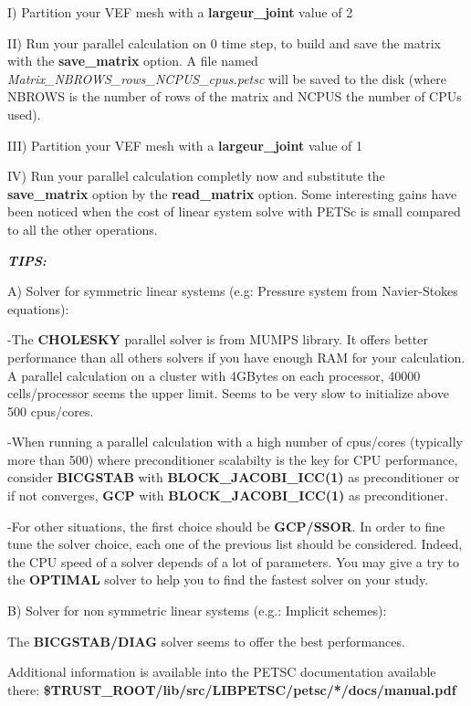 I) Partition your VEF mesh with a \textbf{largeur\_joint }value of 2

II) Run your parallel calculation on 0 time step, to build and save the matrix with the \textbf{save\_matrix} option. A
file named \textit{Matrix\_NBROWS\_rows\_NCPUS\_cpus.petsc} will be saved to the disk (where NBROWS is the number of
rows of the matrix and NCPUS the number of CPUs used). 

III) Partition your VEF mesh with a \textbf{largeur\_joint} value of 1

IV) Run your parallel calculation completly now and substitute the \textbf{save\_matrix} option by the
\textbf{read\_matrix} option. Some interesting gains have been noticed when the cost of linear system solve with PETSc
is small compared to all the other operations. 


\bigskip


\bigskip

{\bfseries\itshape
TIPS:}

A) Solver for symmetric linear systems (e.g: Pressure system from Navier-Stokes equations):

{}-The \textbf{CHOLESKY} parallel solver is from MUMPS library. It offers better performance than all others solvers if
you have enough RAM for your calculation. A parallel calculation on a cluster with 4GBytes on each processor, 40000
cells/processor seems the upper limit. Seems to be very slow to initialize above 500 cpus/cores.


\bigskip

{}-When running a parallel calculation with a high number of cpus/cores (typically more than 500) where preconditioner
scalabilty is the key for CPU performance, consider \textbf{BICGSTAB }with \textbf{BLOCK\_JACOBI\_ICC(1)} as
preconditioner or if not converges, \textbf{GCP}\textbf{ }with\textbf{ BLOCK\_JACOBI\_ICC(1) }as
preconditioner.


\bigskip

{}-For other situations, the first choice should be \textbf{GCP}\textbf{/SSOR}. In order to fine
tune the solver choice, each one of the previous list should be considered. Indeed, the CPU speed of a solver depends
of a lot of parameters. You may give a try to the \textbf{OPTIMAL} solver to help you to find the fastest solver on
your study. 


\bigskip

B) Solver for non symmetric linear systems (e.g.: Implicit schemes):

The \textbf{BICGSTAB/DIAG }solver seems to offer the best performances.


\bigskip

Additional information is available into the PETSC documentation available there:
\textbf{\$TRUST\_ROOT/lib/src/LIBPETSC/petsc/*/docs/manual.pdf}
